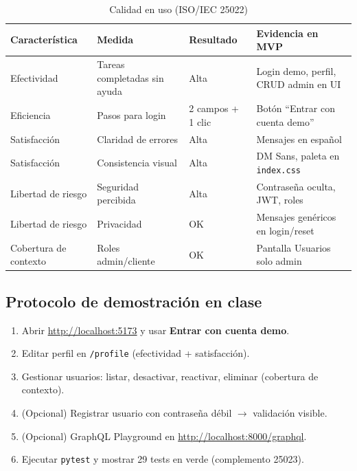 \documentclass[11pt,a4paper]{article}
\begin{document}
\begin{table}[h]
  \centering
  \caption{Calidad en uso (ISO/IEC 25022)}
  \label{tab:25022}
  \small
  \begin{tabular}{@{}p{3cm}p{4.2cm}p{2cm}p{4.5cm}@{}}
    \toprule
    \textbf{Característica} & \textbf{Medida} & \textbf{Resultado} & \textbf{Evidencia en MVP} \\
    \midrule
    Efectividad & Tareas completadas sin ayuda & Alta & Login demo, perfil, CRUD admin en UI \\
    Eficiencia & Pasos para login & 2 campos + 1 clic & Botón ``Entrar con cuenta demo'' \\
    Satisfacción & Claridad de errores & Alta & Mensajes en español \\
    Satisfacción & Consistencia visual & Alta & DM Sans, paleta en \texttt{index.css} \\
    Libertad de riesgo & Seguridad percibida & Alta & Contraseña oculta, JWT, roles \\
    Libertad de riesgo & Privacidad & OK & Mensajes genéricos en login/reset \\
    Cobertura de contexto & Roles admin/cliente & OK & Pantalla Usuarios solo admin \\
    \bottomrule
  \end{tabular}
\end{table}

\subsection{Protocolo de demostración en clase}
\begin{enumerate}[noitemsep]
  \item Abrir \url{http://localhost:5173} y usar \textbf{Entrar con cuenta demo}.
  \item Editar perfil en \texttt{/profile} (efectividad + satisfacción).
  \item Gestionar usuarios: listar, desactivar, reactivar, eliminar (cobertura de contexto).
  \item (Opcional) Registrar usuario con contraseña débil $\rightarrow$ validación visible.
  \item (Opcional) GraphQL Playground en \url{http://localhost:8000/graphql}.
  \item Ejecutar \texttt{pytest} y mostrar 29 tests en verde (complemento 25023).
\end{enumerate}
\end{document}
